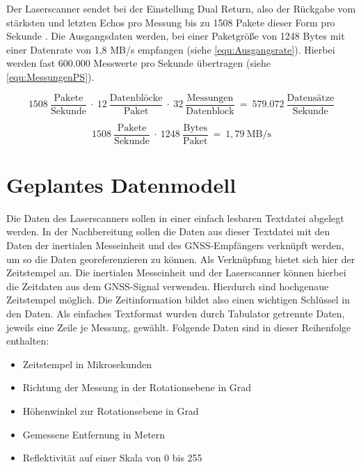 \documentclass[a4paper,12pt,bibliography=totoc, listof=totoc,titlepage,pointlessnumbers]{scrreprt}
\begin{document}
Der Laser\-scan\-ner sendet bei der Einstellung Dual Return, also der Rückgabe vom stärksten und letzten Echos pro Messung 
bis zu 1508 Pakete dieser Form pro Sekunde \citep[S. 49]{vlpManual}. Die Ausgangsdaten werden, bei einer Paketgröße von 1248 Bytes mit einer Datenrate von 1,8 MB/s empfangen (siehe \autoref{equ:Ausgangsrate}). Hierbei werden fast 600.000 Messwerte pro Sekunde übertragen (siehe \autoref{equ:MessungenPS}).

\begin{equation}
1508~\frac{\text{Pakete}}{\text{Sekunde}}~\cdot~12~\frac{\text{Datenbl\"{o}cke}}{\text{Paket}}~\cdot~
32~\frac{\text{Messungen}}{\text{Datenblock}}~=~579.072~\frac{\text{Datens\"{a}tze}}{\text{Sekunde}}
 \label{equ:MessungenPS}
\end{equation}

\begin{equation}
1508~\frac{\text{Pakete}}{\text{Sekunde}}~\cdot~1248~\frac{\text{Bytes}}{\text{Paket}}~=~1,79~\text{MB/s}
 \label{equ:Ausgangsrate}
\end{equation}

\section{Geplantes Datenmodell}
\label{s:datenmodell}
Die Daten des Laser\-scan\-ners sollen in einer einfach lesbaren Textdatei abgelegt werden. In der Nachbereitung sollen die Daten aus dieser Textdatei mit den Daten der inertialen Messeinheit und des GNSS-Empfängers verknüpft werden, um so die Daten georeferenzieren zu können. Als Verknüpfung bietet sich hier der Zeitstempel an. Die inertialen Messeinheit und der Laser\-scan\-ner können hierbei die Zeitdaten aus dem GNSS-Signal verwenden. Hierdurch sind hochgenaue Zeitstempel möglich. Die Zeitinformation bildet also einen wichtigen Schlüssel in den Daten. Als einfaches Textformat wurden durch Tabulator getrennte Daten, jeweils eine Zeile je Messung, gewählt. Folgende Daten sind in dieser Reihenfolge enthalten:

\begin{itemize}
 \item Zeitstempel in Mikrosekunden
 \item Richtung der Messung in der Rotationsebene in Grad
 \item Höhenwinkel zur Rotationsebene in Grad
 \item Gemessene Entfernung in Metern
 \item Reflektivität auf einer Skala von 0 bis 255
\end{itemize}
\end{document}
